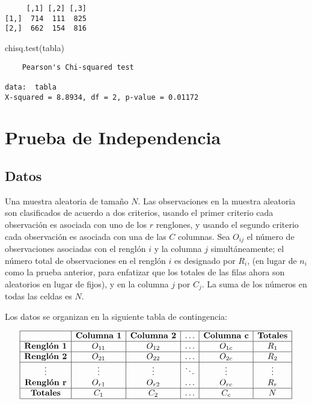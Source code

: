 \documentclass[
  a4paper,
  oneside,
  openany]{book}
\newenvironment{Shaded}{\begin{snugshade}}{\end{snugshade}}
\newcommand{\FunctionTok}[1]{\textcolor[rgb]{0.00,0.00,0.00}{#1}}
\newcommand{\NormalTok}[1]{#1}
\begin{document}
\begin{verbatim}
     [,1] [,2] [,3]
[1,]  714  111  825
[2,]  662  154  816
\end{verbatim}

\begin{Shaded}
\begin{Highlighting}[]
\FunctionTok{chisq.test}\NormalTok{(tabla)}
\end{Highlighting}
\end{Shaded}

\begin{verbatim}
    Pearson's Chi-squared test

data:  tabla
X-squared = 8.8934, df = 2, p-value = 0.01172
\end{verbatim}

\hypertarget{prueba-de-independencia}{%
\chapter{Prueba de Independencia}\label{prueba-de-independencia}}

\hypertarget{datos-11}{%
\section{Datos}\label{datos-11}}

Una muestra aleatoria de tamaño \(N\). Las observaciones en la muestra aleatoria son clasificados de acuerdo a dos criterios, usando el primer criterio cada observación es asociada con uno de los \(r\) renglones, y usando el segundo criterio cada observación es asociada con una de las \(C\) columnas.
Sea \(O_{ij}\) el número de observaciones asociadas con el renglón \(i\) y la columna \(j\) simultáneamente; el número total de observaciones en el renglón \(i\) es designado por \(R_{i}\), (en lugar de \(n_{i}\) como la prueba anterior, para enfatizar que los totales de las filas ahora son aleatorios en lugar de fijos), y en la columna \(j\) por \(C_{j}\). La suma de los números en todas las celdas es \(N\).

Los datos se organizan en la siguiente tabla de contingencia:

\[
\begin{array}{|c|c|c|c|c|c|} 
\hline
&\textbf{Columna 1} &\textbf{Columna 2} &\ldots&\textbf{Columna c}&\textbf{Totales}\\
\hline
\textbf{Renglón 1} &O_{11} &O_{12} &\ldots&O_{1c}&R_1\\
\hline
\textbf{Renglón 2} &O_{21} &O_{22} &\ldots&O_{2c}&R_2\\
\hline
\vdots& \vdots& \vdots& \ddots&\vdots& \vdots\\
\textbf{Renglón r}&O_{r1} &O_{r2} &\ldots&O_{rc}&R_r\\
\hline
\textbf{Totales}&C_1&C_2&\ldots&C_c&N\\
\hline
\end {array}
\]
\end{document}
